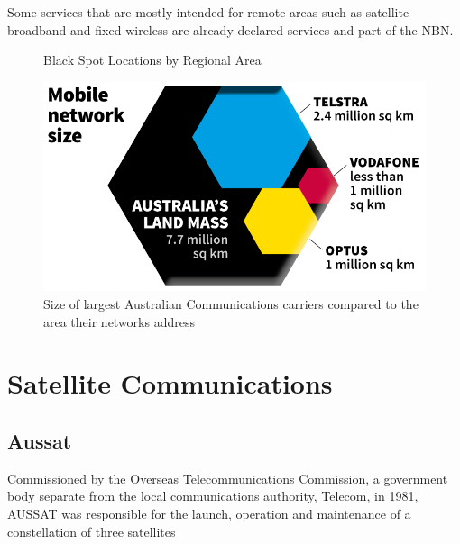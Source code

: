 Some services that are mostly intended for remote areas such as satellite broadband and fixed wireless are already declared services and part of the NBN. 

\begin{figure}[ht]
\centering
{}
\caption{Black Spot Locations by Regional Area\cite{RefWorks:404}}
\label{fig:BlackSpotsbyRegion}
\end{figure}


\begin{figure}[ht]
\centering
\includegraphics[scale=0.3]{figures/1510coverage729px.png}
\caption{Size of largest Australian Communications carriers compared to the area their networks address\cite{Battersby}}
\label{fig:NetworkSizeVLandmass}
\end{figure}


\section{Satellite Communications}
\subsection{Aussat}
Commissioned by the Overseas Telecommunications Commission, a government body separate from the local communications authority, Telecom, in 1981, AUSSAT was responsible for the launch, operation and maintenance of a constellation of three satellites


